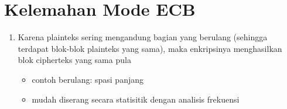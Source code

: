 \documentclass{article}
\begin{document}

\section*{Kelemahan Mode ECB}

\begin{enumerate}
    \item Karena plainteks sering mengandung bagian yang berulang (sehingga terdapat blok-blok plainteks yang sama), maka enkripsinya menghasilkan blok cipherteks yang sama pula
    \begin{itemize}
        \item contoh berulang: spasi panjang
        \item mudah diserang secara statisitik dengan analisis frekuensi
    \end{itemize}
\end{enumerate}
\end{document}
